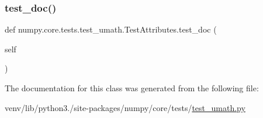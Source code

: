 \mbox{\label{classnumpy_1_1core_1_1tests_1_1test__umath_1_1TestAttributes_ab3bdf2fa04f721e1b07773647f6c2dd8}} 
\subsubsection{\texorpdfstring{test\+\_\+doc()}{test\_doc()}}
{\footnotesize\ttfamily def numpy.\+core.\+tests.\+test\+\_\+umath.\+Test\+Attributes.\+test\+\_\+doc (\begin{DoxyParamCaption}\item[{}]{self }\end{DoxyParamCaption})}



The documentation for this class was generated from the following file\+:\begin{DoxyCompactItemize}
\item 
venv/lib/python3./site-\/packages/numpy/core/tests/\hyperlink{test__umath_8py}{test\+\_\+umath.\+py}\end{DoxyCompactItemize}
